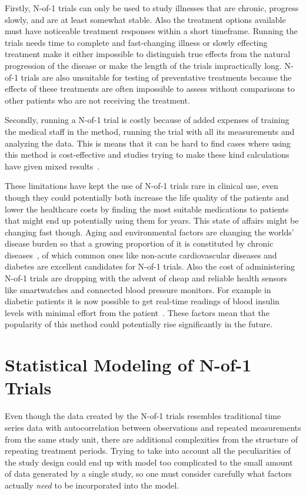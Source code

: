 \documentclass[12pt,a4paper,leqno]{report}
\theoremstyle{plain}
\theoremstyle{definition}
\theoremstyle{remark}
\begin{document}
Firstly, N-of-1 trials can only be used to study illnesses that are chronic,
progress slowly, and are at least somewhat stable. Also the treatment options
available must have noticeable treatment responses within a short timeframe.
Running the trials needs time to complete and fast-changing illness or slowly
effecting treatment make it either impossible to distinguish true effects from
the natural progression of the disease or make the length of the trials
impractically long. N-of-1 trials are also unsuitable for testing of
preventative treatments because the effects of these treatments are often
impossible to assess without comparisons to other patients who are not receiving
the treatment.

Secondly, running a N-of-1 trial is costly because of added expenses of training
the medical staff in the method, running the trial with all its measurements and
analyzing the data. This is means that it can be hard to find cases where using
this method is cost-effective and studies trying to make these kind calculations
have given mixed results\ \cite{costs}.

These limitations have kept the use of N-of-1 trials rare in clinical use, even
though they could potentially both increase the life quality of the patients and
lower the healthcare costs by finding the most suitable medications to patients that
might end up potentially using them for years. This state of affairs might be
changing fast though. Aging and environmental factors are changing the worlds'
disease burden so that a growing proportion of it is constituted by chronic
diseases\ \cite{diseaseburden}, of which common ones like non-acute cardiovascular
diseases and diabetes are excellent candidates for N-of-1 trials. Also the cost
of administering N-of-1 trials are dropping with the advent of cheap and reliable
health sensors like smartwatches and connected blood pressure monitors. For
example in diabetic patients it is now possible to get real-time readings of
blood insulin levels with minimal effort from the patient\ \cite{cgm}. These
factors mean that the popularity of this method could potentially rise
significantly in the future.

\chapter{Statistical Modeling of N-of-1 Trials}\label{modeling}

Even though the data created by the N-of-1 trials resembles traditional time
series data with autocorrelation between observations and repeated measurements
from the same study unit, there are additional complexities from the structure of repeating treatment periods. Trying to take into account all
the peculiarities of the study design could end up with model too complicated to
the small amount of data generated by a single study, so one must consider
carefully what factors actually \emph{need} to be incorporated into the model.
\end{document}
